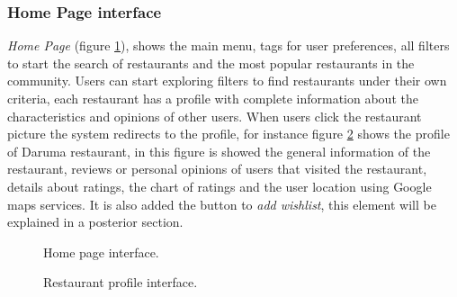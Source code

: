 \subsubsection{Home Page interface}
\textit{Home Page} (figure \ref{fig:home-page}), shows the main 
menu, tags for user preferences,
all filters to start the search of restaurants and the most popular
restaurants in the community. Users can start exploring filters
to find restaurants under their own criteria, each restaurant has a
profile with complete information about the characteristics and
opinions of other users. When users click the restaurant picture the
system redirects to the profile, for instance figure \ref{fig:rest-profile2}  
shows the profile of Daruma restaurant, in this figure is showed the general
information of the restaurant, reviews or personal opinions of users
that visited the restaurant, details about ratings, the chart of
ratings and the user location using Google maps services. It is also
added the button to \textit{add wishlist}, this element will be explained in a
posterior section.
\begin{figure}
\captionsetup{font=footnotesize}
\centering
{}
\caption{Home page interface.}
\label{fig:home-page}   
\end{figure}
\begin{figure}
\captionsetup{font=footnotesize}
\centering
{}
\caption{Restaurant profile interface.}
\label{fig:rest-profile2}   
\end{figure}
